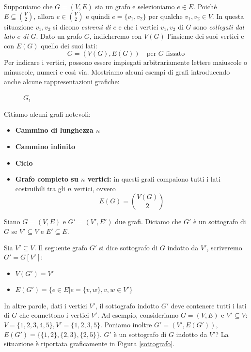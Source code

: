 \documentclass[oneside]{book}
\theoremstyle{remark}
\begin{document}
\noindent Supponiamo che $G=(V,E)$ sia un grafo e selezioniamo $e\in E$. Poiché $E \subseteq
\binom{V}{2}$, allora $e \in \binom{V}{2}$ e quindi $e=\{v_1,v_2\}$ per qualche
$v_1,v_2\in V$. In questa situazione $v_1,v_2$ si dicono \textit{estremi di $e$}
e che i vertici $v_1,v_2$ di $G$ sono \textit{collegati dal lato $e$ di $G$}.
Dato un grafo $G$, indicheremo con $V(G)$ l'insieme dei suoi vertici e con $E(G)$
quello dei suoi lati: \[ G=(V(G), E(G)) \quad \text{per } G \text{ fissato} \]
Per indicare i vertici, possono essere impiegati arbitrariamente lettere
maiuscole o minuscole, numeri e così via. Mostriamo alcuni esempi di grafi
introducendo anche alcune rappresentazioni grafiche:
\begin{figure}[H]
\centering
\caption{$G_1$}
\end{figure}
\noindent Citiamo alcuni grafi notevoli:
\begin{itemize}
\item \textbf{Cammino di lunghezza $n$}
\item \textbf{Cammino infinito}
\item \textbf{Ciclo}
\item \textbf{Grafo completo su $n$ vertici:} in questi grafi
compaiono tutti i lati costruibili tra gli $n$ vertici, ovvero
\[ E(G) = \binom{V(G)}{2} \]
\end{itemize}
\begin{tcolorbox}[colback=yellow!30, colframe=yellow!30!black, title=Sottografo]
Siano $G=(V,E)$ e $G'=(V',E')$ due grafi. Diciamo che $G'$ è un sottografo di $G$
se $V'\subseteq V$ e $E'\subseteq E$.
\end{tcolorbox}
\begin{tcolorbox}[colback=yellow!30, colframe=yellow!30!black, title=Sottografo Indotto]
Sia $V'\subseteq V$. Il seguente grafo $G'$ si dice sottografo di $G$ indotto da
$V'$, scriveremo $G'=G[V']$:
\begin{itemize}
\item $V(G')=V'$
\item $E(G')=\{e\in E| e=\{v,w\}, v,w \in V'\}$
\end{itemize}
\end{tcolorbox}
\noindent In altre parole, dati i vertici $V'$, il sottografo indotto $G'$ deve contenere
tutti i lati di $G$ che connettono i vertici $V'$.
Ad esempio, consideriamo $G=(V,E)$ e $V'\subseteq V$: $V=\{1,2,3,4,5\}, V'=\{1,2,3,5\}$.
Poniamo inoltre $G'=(V',E(G'))$, $E(G')=\{\{1,2\}, \{2,3\}, \{2,5\}\}$. $G'$ è un sottografo
di $G$ indotto da $V'$? La situazione è riportata graficamente in Figura \ref{sottografo}.
\end{document}
